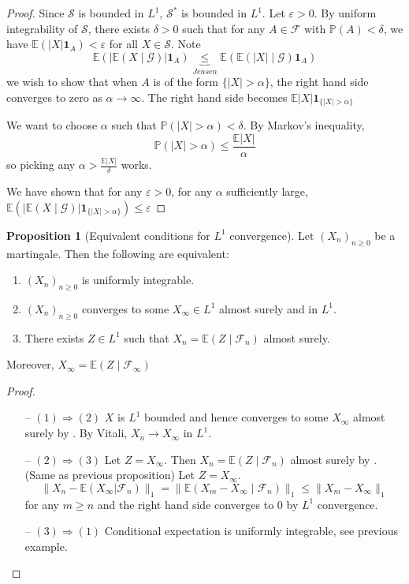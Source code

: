 \documentclass[parskip=full]{article}
\theoremstyle{definition}
\newtheorem{proposition}{Proposition}[section]
\newcommand{\Pbb}{\mathbb{P}}
\newcommand{\1}{\mathbbm{1}}
\newcommand{\E}{\mathbb{E}}
\begin{document}
\begin{proof}
  Since $\mathcal{S}$ is bounded in $L^1$, $\mathcal{S}^*$ is bounded in $L^1$. Let $\varepsilon > 0$. By uniform integrability of $\mathcal{S}$, there exists $\delta > 0$ such that for any $A \in \mathcal{F}$ with $\Pbb(A) < \delta$, we have $\E(|X| \mathbf{1}_A) < \varepsilon$ for all $X \in \mathcal{S}$. Note
  \[
    \E(|\E(X \mid \mathcal{G})|\mathbf{1}_A) \underbrace{\leq}_{Jensen} \E(\E (|X| \mid \mathcal{G})\mathbf{1}_A)
  \]
  we wish to show that when $A$ is of the form $\{|X| > \alpha\}$, the right hand side converges to zero as $\alpha \to \infty$. The right hand side becomes
$
    \E|X| \mathbf{1}_{\{|X| > \alpha\}}
$
  
  We want to choose $\alpha$ such that $\Pbb(|X| > \alpha) < \delta$. By Markov's inequality, 
  \[
    \Pbb(|X| > \alpha) \leq \frac{\E|X|}{\alpha}
  \]
  so picking any $\alpha > \frac{\E|X|}{\delta}$ works.

  We have shown that for any $\varepsilon > 0$, for any $\alpha$ sufficiently large, $\E(\left|\E(X \mid \mathcal{G})\right|\mathbf{1}_{\{|X|>\alpha\}}) \leq \varepsilon$
\end{proof}

\begin{proposition}[Equivalent conditions for $L^1$ convergence] \label{Equivalent conditions for L1 convergence}
  Let $(X_n)_{n \geq 0}$ be a martingale. Then the following are equivalent:
  \begin{enumerate}
    \item $(X_n)_{n \geq 0}$ is uniformly integrable.
    \item $(X_n)_{n \geq 0}$ converges to some $X_\infty \in L^1$ almost surely and in $L^1$.
    \item There exists $Z \in L^1$ such that $X_n = \E(Z \mid \mathcal{F}_n)$ almost surely.
  \end{enumerate}
  Moreover, $X_\infty = \E(Z \mid \mathcal{F}_\infty)$
\end{proposition}

\begin{proof}
  \begin{itemize}
    \item [--] $(1) \Rightarrow (2)$ $X$ is $L^1$ bounded and hence converges to some $X_\infty$ almost surely by . By Vitali, $X_n \to X_\infty$ in $L^1$.
    \item [--] $(2) \Rightarrow (3)$ Let $Z = X_\infty$. Then $X_n = \E(Z \mid \mathcal{F}_n)$ almost surely by .
     (Same as previous proposition) Let $Z = X_\infty$. 
    \[
      \|X_n - \E (X_\infty | \mathcal{F}_n)\|_1 = \|\E(X_m - X_\infty \mid \mathcal{F}_n)\|_1 \leq \|X_m - X_\infty\|_1
    \]
    for any $m \geq n$ and the right hand side converges to $0$ by $L^1$ convergence.
    \item [--] $(3) \Rightarrow (1)$ Conditional expectation is uniformly integrable, see previous example.
  \end{itemize}
\end{proof}
\end{document}
